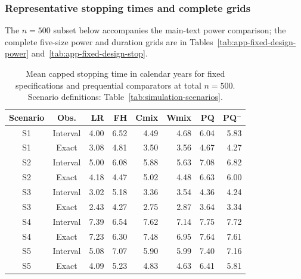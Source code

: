 \documentclass[12pt]{article}
\theoremstyle{definition}
\theoremstyle{remark}
\begin{document}
\subsubsection{Representative stopping times and complete grids}
The $n=500$ subset below accompanies the main-text power comparison; the complete five-size power and duration grids are in Tables~\ref{tab:app-fixed-design-power} and~\ref{tab:app-fixed-design-stop}.
\begin{table}[H]
\centering
\small
\setlength{\tabcolsep}{3pt}
\renewcommand{\arraystretch}{1.10}
\caption{Mean capped stopping time in calendar years for fixed specifications and prequential comparators at total $n=500$. Scenario definitions: Table~\ref{tab:simulation-scenarios}.}\label{tab:fixed-design-stop}
\begin{tabular}{ccrrrrrr}
\toprule
Scenario & Obs. & LR & FH & Cmix & Wmix & PQ & PQ$^{-}$ \\
\midrule
S1 & Interval & 4.00 & 6.52 & 4.49 & 4.68 & 6.04 & 5.83 \\
S1 & Exact & 3.08 & 4.81 & 3.50 & 3.56 & 4.67 & 4.27 \\
S2 & Interval & 5.00 & 6.08 & 5.88 & 5.63 & 7.08 & 6.82 \\
S2 & Exact & 4.18 & 4.47 & 5.02 & 4.48 & 6.63 & 6.00 \\
S3 & Interval & 3.02 & 5.18 & 3.36 & 3.54 & 4.36 & 4.24 \\
S3 & Exact & 2.43 & 4.27 & 2.75 & 2.87 & 3.64 & 3.34 \\
S4 & Interval & 7.39 & 6.54 & 7.62 & 7.14 & 7.75 & 7.72 \\
S4 & Exact & 7.23 & 6.30 & 7.48 & 6.95 & 7.64 & 7.61 \\
S5 & Interval & 5.08 & 7.07 & 5.90 & 5.99 & 7.40 & 7.16 \\
S5 & Exact & 4.09 & 5.23 & 4.83 & 4.63 & 6.41 & 5.81 \\
\bottomrule
\end{tabular}
\end{table}
\end{document}
